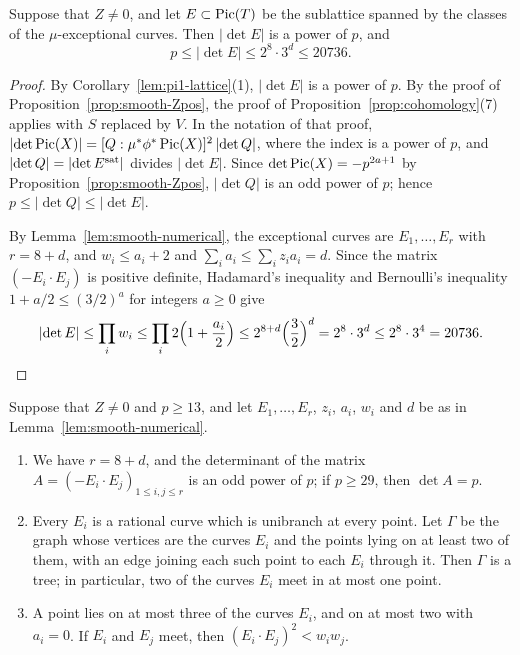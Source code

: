 \begin{proposition}\label{prop:smooth-det}
Suppose that $Z\neq 0$, and let $E\subset\operatorname{Pic}(T)$ be the sublattice spanned by the classes of the $\mu$-exceptional curves.
Then $\lvert\det E\rvert$ is a power of $p$, and
\[
  p\leq\lvert\det E\rvert\leq 2^8\cdot 3^d\leq 20736.
\]
\end{proposition}

\begin{proof}
By Corollary~\ref{lem:pi1-lattice}(1), $\lvert\det E\rvert$ is a power of $p$.
By the proof of Proposition~\ref{prop:smooth-Zpos}, the proof of Proposition~\ref{prop:cohomology}(7) applies with $S$ replaced by $V$.
In the notation of that proof, $\lvert\det\operatorname{Pic}(X)\rvert = [Q:\mu^*\phi^*\operatorname{Pic}(X)]^2\,\lvert\det Q\rvert$, where the index is a power of $p$, and $\lvert\det Q\rvert = \lvert\det E^{\rm sat}\rvert$ divides $\lvert\det E\rvert$.
Since $\det\operatorname{Pic}(X) = -p^{2a+1}$ by Proposition~\ref{prop:smooth-Zpos}, $\lvert\det Q\rvert$ is an odd power of $p$; hence $p\leq\lvert\det Q\rvert\leq\lvert\det E\rvert$.

By Lemma~\ref{lem:smooth-numerical}, the exceptional curves are $E_1,\dots,E_r$ with $r = 8+d$, and $w_i\leq a_i+2$ and $\sum_ia_i\leq\sum_iz_ia_i = d$.
Since the matrix $(-E_i\cdot E_j)$ is positive definite, Hadamard's inequality and Bernoulli's inequality $1+a/2\leq(3/2)^a$ for integers $a\geq 0$ give
\[
  \lvert\det E\rvert\leq\prod_iw_i\leq\prod_i2\Bigl(1+\frac{a_i}{2}\Bigr)\leq 2^{8+d}\Bigl(\frac32\Bigr)^d = 2^8\cdot 3^d\leq 2^8\cdot 3^4 = 20736.
\]
\end{proof}

\begin{lemma}\label{lem:smooth-config}
Suppose that $Z\neq 0$ and $p\geq 13$, and let $E_1,\dots,E_r$, $z_i$, $a_i$, $w_i$ and $d$ be as in Lemma~\textup{\ref{lem:smooth-numerical}}.
\begin{enumerate}
\item We have $r = 8+d$, and the determinant of the matrix $A = (-E_i\cdot E_j)_{1\leq i,j\leq r}$ is an odd power of $p$; if $p\geq 29$, then $\det A = p$.
\item Every $E_i$ is a rational curve which is unibranch at every point.
  Let $\Gamma$ be the graph whose vertices are the curves $E_i$ and the points lying on at least two of them, with an edge joining each such point to each $E_i$ through it.
  Then $\Gamma$ is a tree; in particular, two of the curves $E_i$ meet in at most one point.
\item A point lies on at most three of the curves $E_i$, and on at most two with $a_i = 0$.
  If $E_i$ and $E_j$ meet, then $(E_i\cdot E_j)^2<w_iw_j$.
\end{enumerate}
\end{lemma}

